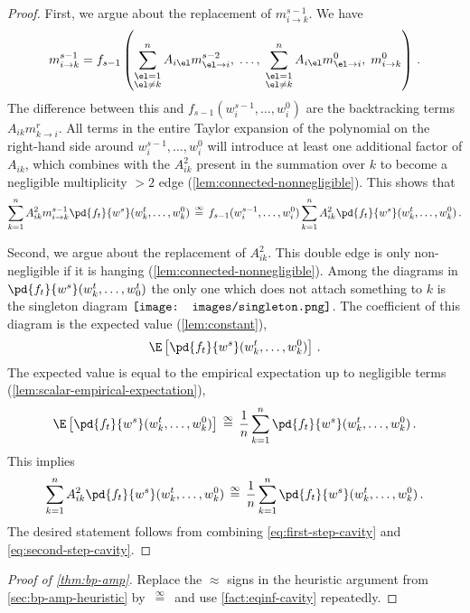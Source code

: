 \documentclass[12pt]{article}
\newcommand{\rootpic}{\vcenter{\hbox{\texttt{[image: images/singleton.png]}}}}
\newcommand{\eqinf}{\,\overset{\infty}{=}\,}
\newcommand{\sdots}{\;\dots,\;}
\begin{document}
\begin{proof}
    First, we argue about the replacement of $m_{i \to k}^{s-1}$. We have
    \[m_{i \to k}^{s-1} = f_{s-1}\left(\sum_{\substack{\el=1\\\el\neq k}}^n A_{i\el} m^{s-2}_{\el\to i}, \sdots \sum_{\substack{\el=1\\\el\neq k}}^n A_{i\el} m^{0}_{\el\to i},\; m_{i \to k}^0\right)\,.\]
    The difference between this and $f_{s-1}(w_i^{s-1}, \dots, w_i^0)$
    are the backtracking terms $A_{ik}m_{k \to i}^r$. All terms in the entire Taylor expansion of the polynomial on the right-hand side around $w_i^{s-1},\ldots,w_i^{0}$ will introduce at least one additional factor of $A_{ik}$, which combines with the $A_{ik}^2$ present in the summation over $k$ to become a negligible multiplicity $> 2$ edge (\cref{lem:connected-nonnegligible}). This shows that
    \begin{align}
        \sum_{k=1}^n A_{ik}^2 m_{i\to k}^{s-1} \pd{f_t}{w^s}(w_k^t, \dots, w_k^0) \eqinf f_{s-1}(w_i^{s-1},\ldots,w_i^0) \sum_{k=1}^n A_{ik}^2 \pd{f_t}{w^s}(w_k^t, \dots, w_k^0)\,.\label{eq:first-step-cavity}
    \end{align}
    
    Second, we argue about the replacement of $A_{ik}^2$.
    This double edge is only non-negligible if it is hanging (\cref{lem:connected-nonnegligible}).
    Among the diagrams in $\pd{f_t}{w^s}(w_k^t, \dots, w_0^t)$
    the only one which does not attach something to $k$ is the singleton diagram $\rootpic$.
    The coefficient of this diagram is the expected value (\cref{lem:constant}),
    \[\E\left[\pd{f_t}{w^s}(w_k^t, \dots, w_k^0) \right]\,.\]
    The expected value is equal to the empirical expectation up to
    negligible terms (\cref{lem:scalar-empirical-expectation}), 
    \[\E\left[\pd{f_t}{w^s}(w_k^t, \dots, w_k^0) \right] \eqinf \frac{1}{n} \sum_{k=1}^n \pd{f_t}{w^s}(w_k^t, \dots, w_k^0)\,.\]
    This implies
    \begin{align}
        \sum_{k=1}^n A_{ik}^2 \pd{f_t}{w^s}(w_k^t, \dots, w_k^0)\eqinf \frac 1 n \sum_{k=1}^n \pd{f_t}{w^s}(w_k^t, \dots, w_k^0)\,.\label{eq:second-step-cavity}
    \end{align}
    The desired statement follows from combining \cref{eq:first-step-cavity} and \cref{eq:second-step-cavity}.
\end{proof}

\begin{proof}[Proof of \cref{thm:bp-amp}]
    Replace the $\approx$ signs in the heuristic argument from \cref{sec:bp-amp-heuristic} by $\eqinf$ and use \cref{fact:eqinf-cavity} repeatedly.
\end{proof}
\end{document}
